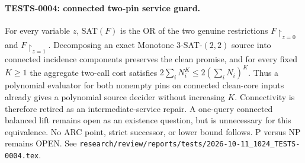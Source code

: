 \paragraph{TESTS-0004: connected two-pin service guard.}
For every variable $z$, SAT$(F)$ is the OR of the two genuine restrictions
$F\upharpoonright_{z=0}$ and $F\upharpoonright_{z=1}$.  Decomposing an exact
Monotone $3$-SAT-$(2,2)$ source into connected incidence components preserves
the clean promise, and for every fixed $K\ge1$ the aggregate two-call cost
satisfies $2\sum_i N_i^K\le2(\sum_iN_i)^K$.  Thus a polynomial evaluator for
both nonempty pins on connected clean-core inputs already gives a polynomial
source decider without increasing $K$.  Connectivity is therefore retired as
an intermediate-service repair.  A one-query connected balanced lift remains
open as an existence question, but is unnecessary for this equivalence.
No ARC point, strict successor, or lower bound follows.  P versus NP remains
OPEN.  See
\texttt{research/review/reports/tests/2026-10-11\_1024\_TESTS-0004.tex}.


